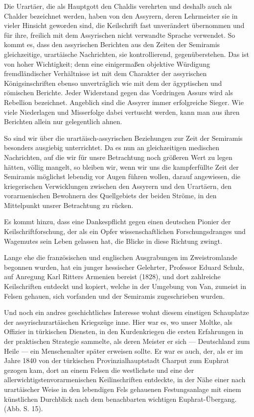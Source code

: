 \documentclass[a4paper, 11pt, oneside, polutonikogreek, german]{article}
\begin{document}
Die Urartäer, die als Hauptgott den Chaldis verehrten und deshalb auch als Chalder bezeichnet werden, haben von den Assyrern, deren Lehrmeister sie in vieler Hinsicht geworden sind, die Keilschrift fast unverändert übernommen und für ihre, freilich mit dem Assyrischen nicht verwandte Sprache verwendet. So kommt es, dass den assyrischen Berichten aus den Zeiten der Semiramis gleichzeitige, urartäische Nachrichten, sie kontrollierend, gegenüberstehen. Das ist von hoher Wichtigkeit; denn eine einigermaßen objektive Würdigung fremdländischer Verhältnisse ist mit dem Charakter der assyrischen Königsinschriften ebenso unverträglich wie mit dem der ägyptischen und römischen Berichte. Jeder Widerstand gegen das Vordringen Assurs wird als Rebellion bezeichnet. Angeblich sind die Assyrer immer erfolgreiche Sieger. Wie viele Niederlagen und Misserfolge dabei vertuscht werden, kann man aus ihren Berichten allein nur gelegentlich ahnen.

So sind wir über die urartäisch-assyrischen Beziehungen zur Zeit der Semiramis besonders ausgiebig unterrichtet. Da es nun an gleichzeitigen medischen Nachrichten, auf die wir für unsre Betrachtung noch größeren Wert zu legen hätten, völlig mangelt, so bleiben wir, wenn wir uns die kampferfüllte Zeit der Semiramis möglichst lebendig vor Augen führen wollen, darauf angewiesen, die kriegerischen Verwicklungen zwischen den Assyrern und den Urartäern, den vorarmenischen Bewohnern des Quellgebiets der beiden Ströme, in den Mittelpunkt unsrer Betrachtung zu rücken.

Es kommt hinzu, dass eine Dankespflicht gegen einen deutschen Pionier der Keilschriftforschung, der als ein Opfer wissenschaftlichen Forschungsdranges und Wagemutes sein Leben gelassen hat, die Blicke in diese Richtung zwingt.

Lange ehe die französischen und englischen Ausgrabungen im Zweistromlande begonnen wurden, hat ein junger hessischer Gelehrter, Professor Eduard Schulz, auf Anregung Karl Ritters Armenien bereist (1828), und dort zahlreiche Keilschriften entdeckt und kopiert, welche in der Umgebung von Van, zumeist in Felsen gehauen, sich vorfanden und der Semiramis zugeschrieben wurden.

Und noch ein andres geschichtliches Interesse wohnt diesem einstigen Schauplatze der assyrischurartäischen Kriegszüge inne. Hier war es, wo unser Moltke, als Offizier in türkischen Diensten, in den Kurdenkriegen die ersten Erfahrungen in der praktischen Strategie sammelte, als deren Meister er sich --- Deutschland zum Heile --- ein Menschenalter später erweisen sollte. Er war es auch, der, als er im Jahre 1840 von der türkischen Provinzialhauptstadt Charput zum Euphrat gezogen kam, dort an einem Felsen die westlichste und eine der allerwichtigstenvorarmenischen Keilinschriften entdeckte, in der Nähe einer nach urartäischer Weise in den lebendigen Fels gehauenen Festungsanlage mit einem künstlichen Durchblick nach dem benachbarten wichtigen Euphrat-Übergang. (Abb. S. 15).
\end{document}
